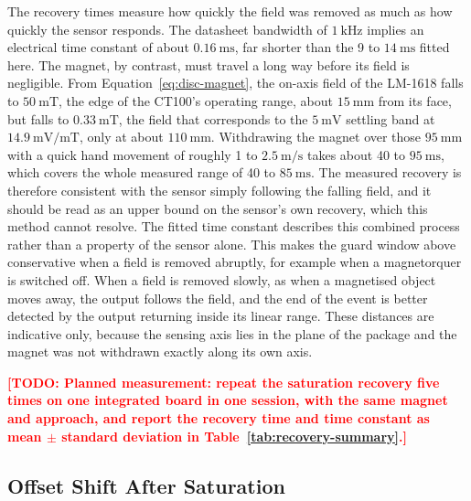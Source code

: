 \documentclass[12pt,a4paper]{article}
\newcommand{\todo}[1]{\textcolor{red}{\textbf{[TODO: #1]}}}
\begin{document}
The recovery times measure how quickly the field was removed as much as how quickly the sensor responds. The datasheet bandwidth of $\SI{1}{\kilo\hertz}$ \cite{digikey_ct100} implies an electrical time constant of about $\SI{0.16}{\milli\second}$, far shorter than the 9 to $\SI{14}{\milli\second}$ fitted here. The magnet, by contrast, must travel a long way before its field is negligible. From Equation~\eqref{eq:disc-magnet}, the on-axis field of the LM-1618 falls to $\SI{50}{\milli\tesla}$, the edge of the CT100's operating range, about $\SI{15}{\milli\metre}$ from its face, but falls to $\SI{0.33}{\milli\tesla}$, the field that corresponds to the $\SI{5}{\milli\volt}$ settling band at $\SI{14.9}{\milli\volt\per\milli\tesla}$, only at about $\SI{110}{\milli\metre}$. Withdrawing the magnet over those $\SI{95}{\milli\metre}$ with a quick hand movement of roughly 1 to $\SI{2.5}{\metre\per\second}$ takes about 40 to $\SI{95}{\milli\second}$, which covers the whole measured range of 40 to $\SI{85}{\milli\second}$. The measured recovery is therefore consistent with the sensor simply following the falling field, and it should be read as an upper bound on the sensor's own recovery, which this method cannot resolve. The fitted time constant describes this combined process rather than a property of the sensor alone. This makes the guard window above conservative when a field is removed abruptly, for example when a magnetorquer is switched off. When a field is removed slowly, as when a magnetised object moves away, the output follows the field, and the end of the event is better detected by the output returning inside its linear range. These distances are indicative only, because the sensing axis lies in the plane of the package and the magnet was not withdrawn exactly along its own axis.

\todo{Planned measurement: repeat the saturation recovery five times on one integrated board in one session, with the same magnet and approach, and report the recovery time and time constant as mean $\pm$ standard deviation in Table~\ref{tab:recovery-summary}.}

\subsection{Offset Shift After Saturation}
\label{sec:disc-hysteresis}
\end{document}
